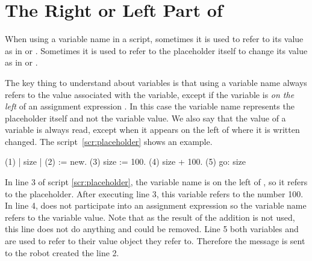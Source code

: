 \section{The Right or Left Part of \ct{:=}}
When using a variable name in a script, sometimes it is used to refer to its value as in  or . Sometimes it is used to refer to the placeholder
itself to change its value as in  or . 

The key thing to understand about variables is that using a variable name always refers to the value associated with the variable, except if the variable is \emph{on the left} of an assignment expression \ct{:=}. In this case the variable name represents the placeholder itself and not the variable value. We also say that the value of a variable is always read, except when it appears on the left of \ct{:=} where it is written \ie changed. The script~\ref{scr:placeholder} shows an example. 

\begin{scriptwithouttitle}\label{scr:placeholder}
(1)   | size \caro |		
(2)   \caro := \Turtle new.
(3)   size := 100.	
(4)   size + 100.
(5)   \caro go: size
\end{scriptwithouttitle}

In line 3 of script \ref{scr:placeholder}, the variable name  is on the left of \ct{:=}, so it refers to the placeholder. After executing line 3, this variable refers to the number 100.  In line 4,  does not participate into an assignment expression so the variable name refers to the variable value. Note that as the result of the addition is not used, this line does not do anything and could be removed. Line 5 both variables \caro and  are used to refer to their value \ie object they refer to. Therefore the message  is sent to the robot created the line 2.







